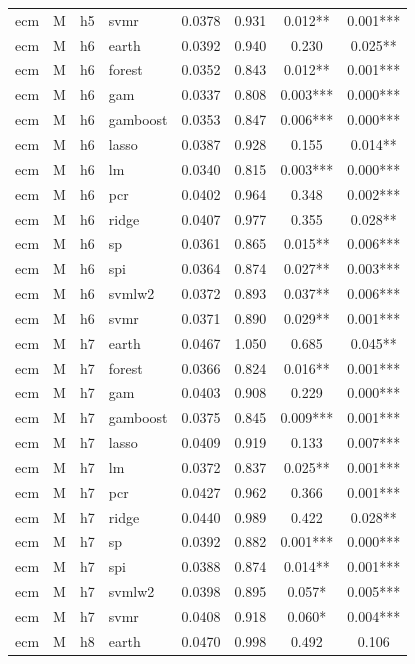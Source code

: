 \begin{ThreePartTable}
\begin{longtable}[t]{llclcccc}
ecm & M & h5 & svmr & 0.0378 & 0.931 & 0.012** & 0.001***\\
\addlinespace
ecm & M & h6 & earth & 0.0392 & 0.940 & 0.230 & 0.025**\\
ecm & M & h6 & forest & 0.0352 & 0.843 & 0.012** & 0.001***\\
ecm & M & h6 & gam & 0.0337 & 0.808 & 0.003*** & 0.000***\\
ecm & M & h6 & gamboost & 0.0353 & 0.847 & 0.006*** & 0.000***\\
ecm & M & h6 & lasso & 0.0387 & 0.928 & 0.155 & 0.014**\\
ecm & M & h6 & lm & 0.0340 & 0.815 & 0.003*** & 0.000***\\
ecm & M & h6 & pcr & 0.0402 & 0.964 & 0.348 & 0.002***\\
ecm & M & h6 & ridge & 0.0407 & 0.977 & 0.355 & 0.028**\\
ecm & M & h6 & sp & 0.0361 & 0.865 & 0.015** & 0.006***\\
ecm & M & h6 & spi & 0.0364 & 0.874 & 0.027** & 0.003***\\
ecm & M & h6 & svmlw2 & 0.0372 & 0.893 & 0.037** & 0.006***\\
ecm & M & h6 & svmr & 0.0371 & 0.890 & 0.029** & 0.001***\\
\addlinespace
ecm & M & h7 & earth & 0.0467 & 1.050 & 0.685 & 0.045**\\
ecm & M & h7 & forest & 0.0366 & 0.824 & 0.016** & 0.001***\\
ecm & M & h7 & gam & 0.0403 & 0.908 & 0.229 & 0.000***\\
ecm & M & h7 & gamboost & 0.0375 & 0.845 & 0.009*** & 0.001***\\
ecm & M & h7 & lasso & 0.0409 & 0.919 & 0.133 & 0.007***\\
ecm & M & h7 & lm & 0.0372 & 0.837 & 0.025** & 0.001***\\
ecm & M & h7 & pcr & 0.0427 & 0.962 & 0.366 & 0.001***\\
ecm & M & h7 & ridge & 0.0440 & 0.989 & 0.422 & 0.028**\\
ecm & M & h7 & sp & 0.0392 & 0.882 & 0.001*** & 0.000***\\
ecm & M & h7 & spi & 0.0388 & 0.874 & 0.014** & 0.001***\\
ecm & M & h7 & svmlw2 & 0.0398 & 0.895 & 0.057* & 0.005***\\
ecm & M & h7 & svmr & 0.0408 & 0.918 & 0.060* & 0.004***\\
\addlinespace
ecm & M & h8 & earth & 0.0470 & 0.998 & 0.492 & 0.106\\

\end{longtable}
\end{ThreePartTable}
